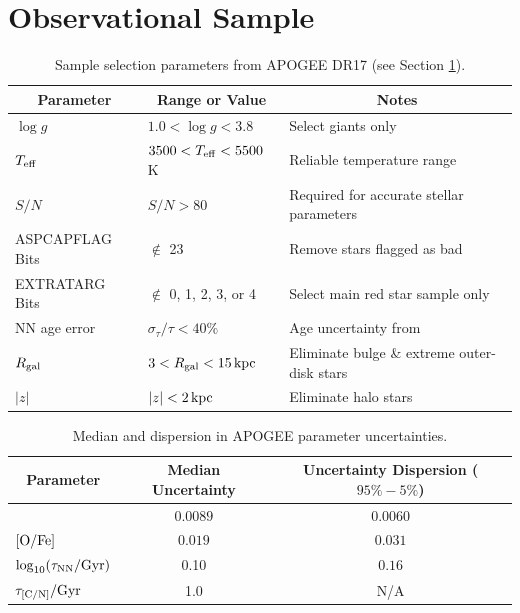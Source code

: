 \documentclass[twocolumn,twocolappendix,linenumbers]{aastex631}
\newcommand{\todo}[1]{{\color{red}#1}}
\newcommand{\mathOFe}{{\rm [O/Fe]}}
\newcommand{\kpc}{\,{\rm kpc}}
\begin{document}
\section{Observational Sample}
\label{sec:observational-sample}

\begin{table}
    \centering
    \caption{Sample selection parameters from APOGEE DR17 (see Section \ref{sec:observational-sample}).}
    \label{tab:sample}
    \begin{tabular}{lll}
        \hline\hline
        \multicolumn{1}{c}{Parameter} & \multicolumn{1}{c}{Range or Value} & \multicolumn{1}{c}{Notes} \\
        \hline
        $\log g$            & $1.0 < \log g < 3.8$          & Select giants only \\
        $T_{\rm eff}$       & $3500 < T_{\rm eff} < 5500$ K & Reliable temperature range \\
        $S/N$               & $S/N > 80$                    & Required for accurate stellar parameters \\
        ASPCAPFLAG Bits     & $\notin$ 23                   & Remove stars flagged as bad \\
        EXTRATARG Bits      & $\notin$ 0, 1, 2, 3, or 4     & Select main red star sample only \\
        NN age error        & $\sigma_\tau/\tau < 40\%$     & Age uncertainty from \citet{leung_variational_2023} \\
        $R_{\rm gal}$     & $3 < R_{\rm gal} < 15\kpc$    & Eliminate bulge \& extreme outer-disk stars \\
        $|z|$               & $|z| < 2\kpc$                 & Eliminate halo stars \\
        \hline
    \end{tabular}
\end{table}

\begin{table}
    \centering
    \caption{Median and dispersion in APOGEE parameter uncertainties.}
    \label{tab:uncertainties}
    \begin{tabular}{lcc}
        \hline\hline
        \multicolumn{1}{c}{Parameter} & \multicolumn{1}{c}{Median Uncertainty} & \multicolumn{1}{c}{Uncertainty Dispersion ($95\%-5\%$)} \\
        \hline
        [Fe/H]          & $0.0089$   & $0.0060$ \\
        $\mathOFe$  & $0.019$    & $0.031$ \\
        $\log_{10}(\tau_{\rm NN}/{\rm Gyr})$    & 0.10   & $0.16$ \\
        $\tau_{\rm [C/N]}/{\rm Gyr}$     & 1.0   & \todo{N/A} \\
        \hline
    \end{tabular}
\end{table}
\end{document}
